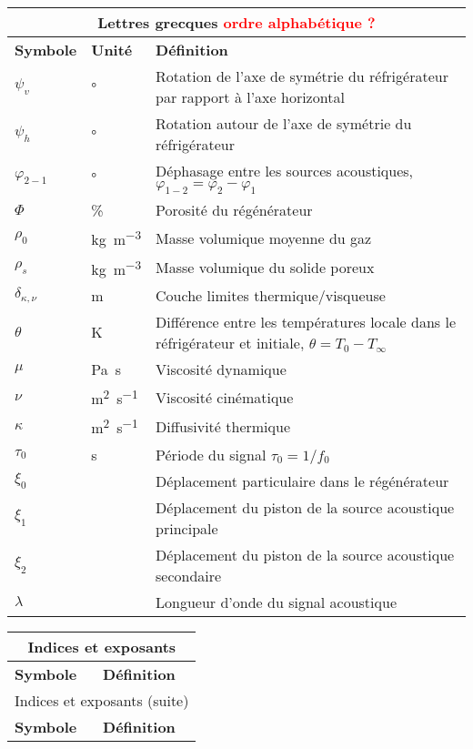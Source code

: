 \begin{center}
    \begin{longtable}{p{} p{} p{}}
        \multicolumn{3}{c}{Lettres grecques \textcolor{red}{ordre alphabétique ?}}  \\\hline
        \textbf{Symbole} & \textbf{Unité} & \textbf{Définition} \\\hline\hline
        $\psi_v$ & \unit{\degree} & Rotation de l'axe de symétrie du réfrigérateur par rapport à l'axe horizontal\\
        $\psi_h$ & \unit{\degree} & Rotation autour de l'axe de symétrie du réfrigérateur \\
        $\varphi_{2-1}$ & \unit{\degree} & Déphasage entre les sources acoustiques, $\varphi_{1-2} = \varphi_2 - \varphi_1$\\
        $\Phi$ & \unit{\percent} & Porosité du régénérateur \\
        $\rho_0$ & \unit{\kilo\gram\per\cubic\meter} & Masse volumique moyenne du gaz \\
        $\rho_{s}$ & \unit{\kilo\gram\per\cubic\meter} & Masse volumique du solide poreux\\
        $\delta_{\kappa,\nu}$ & \unit{\meter} & Couche limites thermique/visqueuse \\
        $\theta$ & \unit{\kelvin} & Différence entre les températures locale dans le réfrigérateur et initiale, $\theta=T_0-T_\infty$\\
        $\mu$ & \unit{\pascal\second} & Viscosité dynamique \\
        $\nu$ & \unit{\square\meter\per\second} & Viscosité cinématique \\
        $\kappa$ & \unit{\square\meter\per\second} & Diffusivité thermique \\
        $\tau_0$ & \unit{\second} & Période du signal $\tau_0 = 1/f_0$ \\
        $\xi_0$ &  & Déplacement particulaire dans le régénérateur \\
        $\xi_1$ &  & Déplacement du piston de la source acoustique principale \\
        $\xi_2$ &  & Déplacement du piston de la source acoustique secondaire \\
        $\lambda$ &  & Longueur d'onde du signal acoustique \\\hline
    \end{longtable}

\bigskip

    \begin{longtable}{p{} p{}}
        \multicolumn{2}{c}{Indices et exposants}  \\\hline
        \textbf{Symbole} & \textbf{Définition} \\\hline\hline \endfirsthead
        \multicolumn{2}{c}{Indices et exposants (suite)}  \\\hline
        \textbf{Symbole} & \textbf{Définition} \\\hline\hline \endhead
		

\end{longtable}
\end{center}
